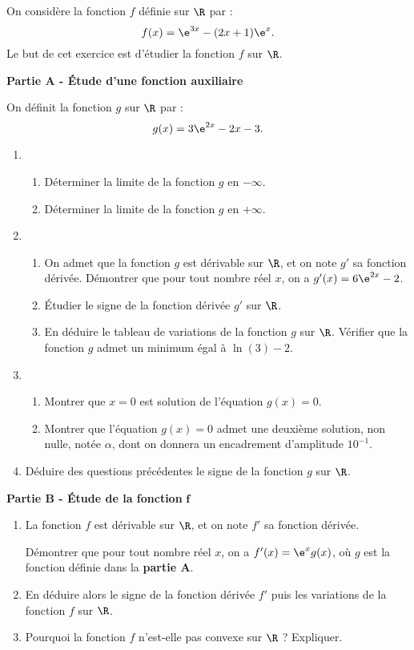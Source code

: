 On considère la fonction $f$ définie sur $\R$ par : \[f(x)=\e^{3 x}-(2 x+1) \e^{x}.\]
%
Le but de cet exercice est d'étudier la fonction $f$ sur $\R$.

\medskip

\textbf{Partie A - Étude d'une fonction auxiliaire}

\medskip

On définit la fonction $g$ sur $\R$ par : \[g(x)=3 \e^{2 x}- 2 x - 3.\]
%
\begin{enumerate}
	\item 
	\begin{enumerate}
		\item Déterminer la limite de la fonction $g$ en $-\infty$.
		\item Déterminer la limite de la fonction $g$ en $+\infty$.
	\end{enumerate}
	\item 
	\begin{enumerate}
		\item On admet que la fonction $g$ est dérivable sur $\R$, et on note $g'$ sa fonction dérivée. Démontrer que pour tout nombre réel $x$, on a $g'(x)=6 \e^{2 x}-2$.
		\item Étudier le signe de la fonction dérivée $g'$ sur $\R$.
		\item En déduire le tableau de variations de la fonction $g$ sur $\R$. Vérifier que la fonction $g$ admet un minimum égal à $\ln (3) - 2$.
	\end{enumerate}
	\item 
	\begin{enumerate}
		\item Montrer que $x=0$ est solution de l'équation $g(x) = 0$.
		\item Montrer que l'équation $g(x)=0$ admet une deuxième solution, non nulle, notée $\alpha$, dont on donnera un encadrement d'amplitude $10^{-1}$.
	\end{enumerate}
	\item Déduire des questions précédentes le signe de la fonction $g$ sur $\R$.
\end{enumerate}

\medskip

\textbf{Partie B - Étude de la fonction} $\bm{f}$

\medskip

\begin{enumerate}
	\item La fonction $f$ est dérivable sur $\R$, et on note $f'$ sa fonction dérivée.
	
	Démontrer que pour tout nombre réel $x$, on a $f'(x)=\e^{x} g(x)$, où $g$ est la fonction définie dans la \textbf{partie A}.
	\item En déduire alors le signe de la fonction dérivée $f'$ puis les variations de la fonction $f$ sur $\R$.
	\item Pourquoi la fonction $f$ n'est-elle pas convexe sur $\R$ ? Expliquer.
\end{enumerate}